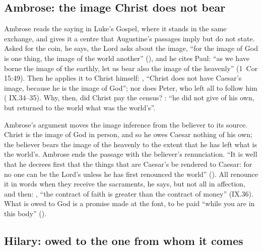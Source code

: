 \subsection{Ambrose: the image Christ does not bear}

Ambrose reads the saying in Luke's Gospel, where it stands in the same
exchange, and gives it a centre that Augustine's passages imply but do not
state. Asked for the coin, he says, the Lord asks about the image, ``for the
image of God is one thing, the image of the world another'' (), and he cites Paul: ``as we have borne the image
of the earthly, let us bear also the image of the heavenly'' (1~Cor 15:49).
Then he applies it to Christ himself: , ``Christ does not have Caesar's image, because
he is the image of God''; nor does Peter, who left all to follow him
( IX.34--35). Why, then, did Christ
pay the census? :
``he did not give of his own, but returned to the world what was the
world's''.

Ambrose's argument moves the image inference from the believer to its source.
Christ is the image of God in person, and so he owes Caesar nothing of his
own; the believer bears the image of the heavenly to the extent that he has
left what is the world's. Ambrose ends the passage with the believer's
renunciation. ``It is well that he decrees first that the things that are
Caesar's be rendered to Caesar: for no one can be the Lord's unless he has
first renounced the world'' (). All renounce it in words when they receive the
sacraments, he says, but not all in affection, and then: , ``the contract of faith is greater than the
contract of money'' (IX.36). What is owed to God is a promise made at the
font, to be paid ``while you are in this body'' ().

\subsection{Hilary: owed to the one from whom it comes}

